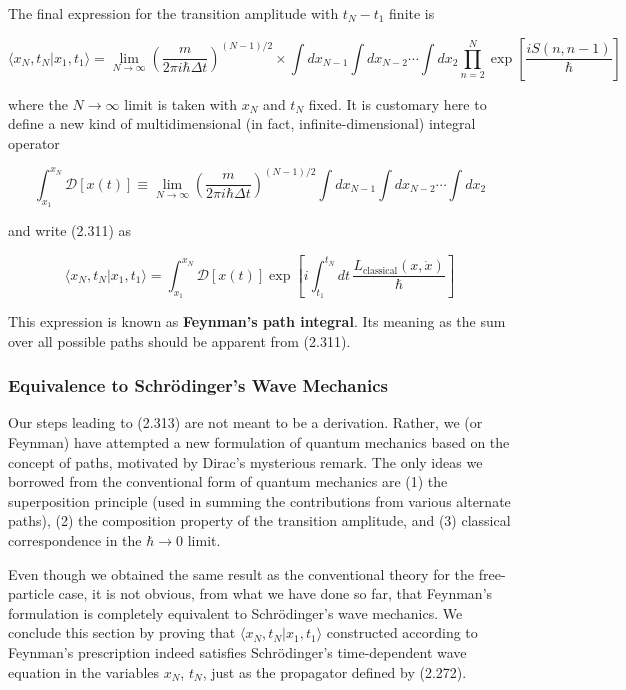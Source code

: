 \documentclass[11pt,a4paper]{article}
\begin{document}
The final expression for the transition amplitude with $t_N - t_1$ finite is

\begin{equation}
\langle x_N, t_N|x_1, t_1\rangle = \lim_{N \to \infty}\left(\frac{m}{2\pi i\hbar\Delta t}\right)^{(N-1)/2} \times \int dx_{N-1}\int dx_{N-2}\cdots\int dx_2\prod_{n=2}^{N}\exp\left[\frac{iS(n, n-1)}{\hbar}\right]
\tag{2.311}
\end{equation}

where the $N \to \infty$ limit is taken with $x_N$ and $t_N$ fixed. It is customary here to define a new kind of multidimensional (in fact, infinite-dimensional) integral operator

\begin{equation}
\int_{x_1}^{x_N}\mathscr{D}[x(t)] \equiv \lim_{N \to \infty}\left(\frac{m}{2\pi i\hbar\Delta t}\right)^{(N-1)/2}\int dx_{N-1}\int dx_{N-2}\cdots\int dx_2
\tag{2.312}
\end{equation}

and write (2.311) as

\begin{equation}
\boxed{\langle x_N, t_N|x_1, t_1\rangle = \int_{x_1}^{x_N}\mathscr{D}[x(t)]\exp\left[i\int_{t_1}^{t_N}dt\,\frac{L_{\text{classical}}(x, \dot{x})}{\hbar}\right]}
\tag{2.313}
\end{equation}

This expression is known as \textbf{Feynman's path integral}. Its meaning as the sum over all possible paths should be apparent from (2.311).

\subsubsection{Equivalence to Schrödinger's Wave Mechanics}

Our steps leading to (2.313) are not meant to be a derivation. Rather, we (or Feynman) have attempted a new formulation of quantum mechanics based on the concept of paths, motivated by Dirac's mysterious remark. The only ideas we borrowed from the conventional form of quantum mechanics are (1) the superposition principle (used in summing the contributions from various alternate paths), (2) the composition property of the transition amplitude, and (3) classical correspondence in the $\hbar \to 0$ limit.

Even though we obtained the same result as the conventional theory for the free-particle case, it is not obvious, from what we have done so far, that Feynman's formulation is completely equivalent to Schrödinger's wave mechanics. We conclude this section by proving that $\langle x_N, t_N|x_1, t_1\rangle$ constructed according to Feynman's prescription indeed satisfies Schrödinger's time-dependent wave equation in the variables $x_N$, $t_N$, just as the propagator defined by (2.272).
\end{document}
